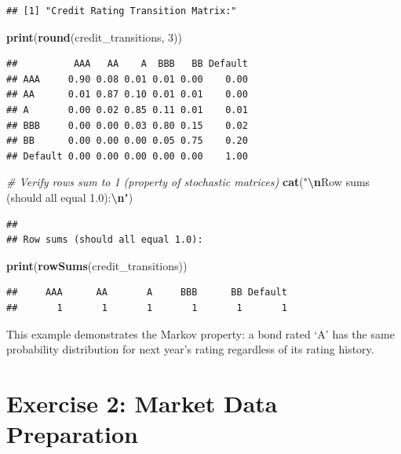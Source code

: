 \documentclass[
]{article}
\newenvironment{Shaded}{\begin{snugshade}}{\end{snugshade}}
\newcommand{\CommentTok}[1]{\textcolor[rgb]{0.56,0.35,0.01}{\textit{#1}}}
\newcommand{\DecValTok}[1]{\textcolor[rgb]{0.00,0.00,0.81}{#1}}
\newcommand{\FunctionTok}[1]{\textcolor[rgb]{0.13,0.29,0.53}{\textbf{#1}}}
\newcommand{\NormalTok}[1]{#1}
\newcommand{\SpecialCharTok}[1]{\textcolor[rgb]{0.81,0.36,0.00}{\textbf{#1}}}
\newcommand{\StringTok}[1]{\textcolor[rgb]{0.31,0.60,0.02}{#1}}
\begin{document}
\begin{verbatim}
## [1] "Credit Rating Transition Matrix:"
\end{verbatim}

\begin{Shaded}
\begin{Highlighting}[]
\FunctionTok{print}\NormalTok{(}\FunctionTok{round}\NormalTok{(credit\_transitions, }\DecValTok{3}\NormalTok{))}
\end{Highlighting}
\end{Shaded}

\begin{verbatim}
##          AAA   AA    A  BBB   BB Default
## AAA     0.90 0.08 0.01 0.01 0.00    0.00
## AA      0.01 0.87 0.10 0.01 0.01    0.00
## A       0.00 0.02 0.85 0.11 0.01    0.01
## BBB     0.00 0.00 0.03 0.80 0.15    0.02
## BB      0.00 0.00 0.00 0.05 0.75    0.20
## Default 0.00 0.00 0.00 0.00 0.00    1.00
\end{verbatim}

\begin{Shaded}
\begin{Highlighting}[]
\CommentTok{\# Verify rows sum to 1 (property of stochastic matrices)}
\FunctionTok{cat}\NormalTok{(}\StringTok{"}\SpecialCharTok{\textbackslash{}n}\StringTok{Row sums (should all equal 1.0):}\SpecialCharTok{\textbackslash{}n}\StringTok{"}\NormalTok{)}
\end{Highlighting}
\end{Shaded}

\begin{verbatim}
## 
## Row sums (should all equal 1.0):
\end{verbatim}

\begin{Shaded}
\begin{Highlighting}[]
\FunctionTok{print}\NormalTok{(}\FunctionTok{rowSums}\NormalTok{(credit\_transitions))}
\end{Highlighting}
\end{Shaded}

\begin{verbatim}
##     AAA      AA       A     BBB      BB Default 
##       1       1       1       1       1       1
\end{verbatim}

This example demonstrates the Markov property: a bond rated `A' has the
same probability distribution for next year's rating regardless of its
rating history.

\hypertarget{exercise-2-market-data-preparation}{%
\section{Exercise 2: Market Data
Preparation}\label{exercise-2-market-data-preparation}}
\end{document}
